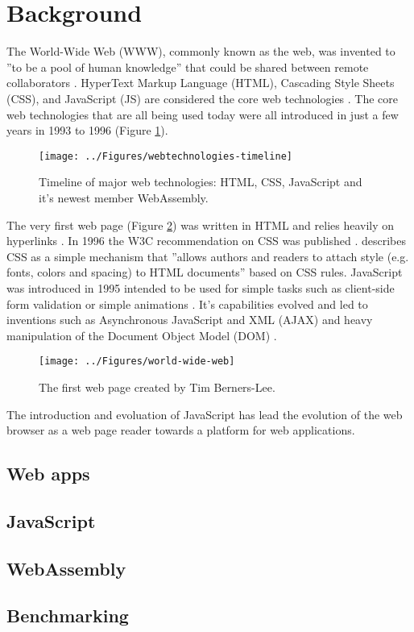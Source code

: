 \section{Background}
\label{background}

The World-Wide Web (WWW), commonly known as the web, was invented to ''to be a pool of human knowledge'' \parencite*[76]{BernersLeeCailliauLuotonenNielsenSecret1994} that could be shared between remote collaborators \parencite{BernersLeeCailliauLuotonenNielsenSecret1994}. HyperText Markup Language (HTML), Cascading Style Sheets (CSS), and JavaScript (JS) are considered the core web technologies \parencite{MajchrzakBiornHansenGronli2018}. The core web technologies that are all being used today were all introduced in just a few years in 1993 to 1996 (Figure \ref{webtechnologies-timeline}).

\begin{figure}[!h]
\centering
\texttt{[image: ../Figures/webtechnologies-timeline]}
\caption{Timeline of major web technologies: HTML, CSS, JavaScript and it's newest member WebAssembly.}
\label{webtechnologies-timeline}
\end{figure}

The very first web page (Figure \ref{world-wide-web}) was written in HTML and relies heavily on hyperlinks \parencite{BernersLeeCailliauGroffPollermann1992}. In 1996 the W3C recommendation on CSS was published \parencite{LieBos1996}. \citeauthor{LieBos1996} describes CSS as a simple mechanism that ''allows authors and readers to attach style (e.g. fonts, colors and spacing) to HTML documents'' \parencite*[1]{LieBos1996} based on CSS rules. JavaScript was introduced in 1995 intended to be used for simple tasks such as client-side form validation or simple animations \parencite{Moller2018}. It's capabilities evolved and led to inventions such as Asynchronous JavaScript and XML (AJAX) \parencite{NielsonWilliamsonArlitt2008} and heavy manipulation of the Document Object Model (DOM) \parencite{WoodLeHorsApparaoByrneChampionIsaacsJacobsNicolRobieSutor1998}.

\begin{figure}[!h]
\centering
\texttt{[image: ../Figures/world-wide-web]}
\caption{The first web page created by Tim Berners-Lee.}
\label{world-wide-web}
\end{figure}

The introduction and evoluation of JavaScript has lead the evolution of the web browser as a web page reader towards a platform for web applications.

\subsection{Web apps}


\subsection{JavaScript}


\subsection{WebAssembly}


\subsection{Benchmarking}

